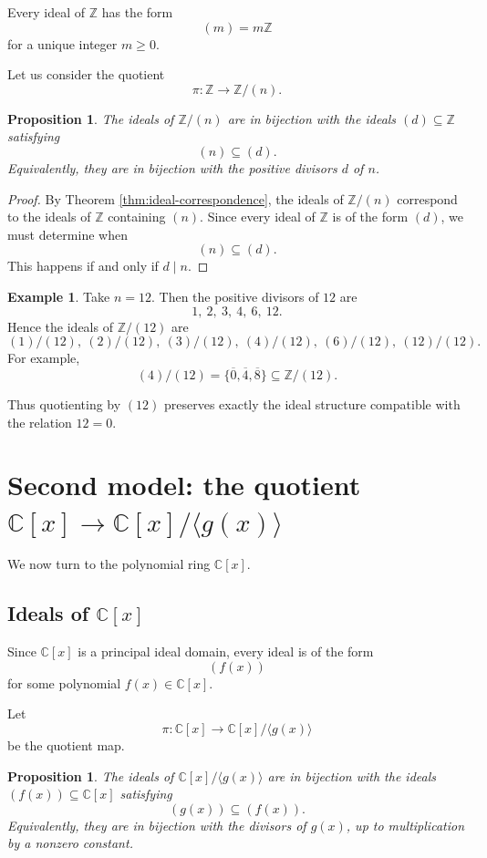 \documentclass[11pt]{article}
\newtheorem{proposition}[theorem]{Proposition}
\theoremstyle{definition}
\newtheorem{example}[theorem]{Example}
\newcommand{\Z}{\mathbb{Z}}
\newcommand{\C}{\mathbb{C}}
\newcommand{\ideal}[1]{\langle #1\rangle}
\newcommand{\ol}[1]{\overline{#1}}
\begin{document}
	Every ideal of \(\Z\) has the form
	\[
	(m)=m\Z
	\]
	for a unique integer \(m\ge 0\).
	
	Let us consider the quotient
	\[
	\pi:\Z\to \Z/(n).
	\]
	
	\begin{proposition}\label{prop:Z-quotient}
		The ideals of \(\Z/(n)\) are in bijection with the ideals \((d)\subseteq \Z\) satisfying
		\[
		(n)\subseteq (d).
		\]
		Equivalently, they are in bijection with the positive divisors \(d\) of \(n\).
	\end{proposition}
	
	\begin{proof}
		By Theorem \ref{thm:ideal-correspondence}, the ideals of \(\Z/(n)\) correspond to the ideals of \(\Z\) containing \((n)\). Since every ideal of \(\Z\) is of the form \((d)\), we must determine when
		\[
		(n)\subseteq (d).
		\]
		This happens if and only if \(d\mid n\).
	\end{proof}
	
	\begin{example}
		Take \(n=12\). Then the positive divisors of \(12\) are
		\[
		1,\ 2,\ 3,\ 4,\ 6,\ 12.
		\]
		Hence the ideals of \(\Z/(12)\) are
		\[
		(1)/(12),\ (2)/(12),\ (3)/(12),\ (4)/(12),\ (6)/(12),\ (12)/(12).
		\]
		For example,
		\[
		(4)/(12)=\{\ol{0},\ol{4},\ol{8}\}\subseteq \Z/(12).
		\]
	\end{example}
	
	Thus quotienting by \((12)\) preserves exactly the ideal structure compatible with the relation \(12=0\).
	
	\section{Second model: the quotient \(\C[x]\to \C[x]/\ideal{g(x)}\)}
	
	We now turn to the polynomial ring \(\C[x]\).
	
	\subsection{Ideals of \(\C[x]\)}
	
	Since \(\C[x]\) is a principal ideal domain, every ideal is of the form
	\[
	(f(x))
	\]
	for some polynomial \(f(x)\in \C[x]\).
	
	Let
	\[
	\pi:\C[x]\to \C[x]/\ideal{g(x)}
	\]
	be the quotient map.
	
	\begin{proposition}\label{prop:Cx-quotient}
		The ideals of \(\C[x]/\ideal{g(x)}\) are in bijection with the ideals \((f(x))\subseteq \C[x]\) satisfying
		\[
		(g(x))\subseteq (f(x)).
		\]
		Equivalently, they are in bijection with the divisors of \(g(x)\), up to multiplication by a nonzero constant.
	\end{proposition}
	
\end{document}
